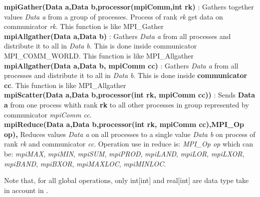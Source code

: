 \documentclass[a4paper,twoside,12pt]{book}
\begin{document}
\textbf{mpiGather(Data a,Data b,processor(mpiComm,int rk)} : Gathers together
values  \textit{Data a}  from a group of processes. Process of rank \textit{rk}
get data on communicator \textit{rk}.  This function is like MPI\_Gather\\


\textbf{mpiAllgather(Data a,Data b)} : Gathers \textit{Data a} from all
processes and distribute it to all in \textit{Data b}. This is done inside
communicator MPI\_COMM\_WORLD. This function is like MPI\_Allgather\\

\textbf{mpiAllgather(Data a,Data b, mpiComm cc)} : Gathers \textit{Data a} from
all processes and distribute it to all in \textit{Data b}. This is done inside
\textbf{communicator cc}. This function is like MPI\_Allgather\\



\textbf{mpiScatter(Data a,Data b,processor(int rk, mpiComm cc))} : Sends
\textbf{Data a} from one process whith rank \textbf{rk} to all other processes
in group represented by communicator  \textit{mpiComm cc}.\\

\textbf{mpiReduce(Data a,Data b,processor(int rk, mpiComm cc),MPI\_Op op), }
Reduces values \textit{Data a} on all processes
to a single value \textit{Data b} on process of rank \textit{rk} and
communicator \textit{cc}.
Operation use in reduce is: \textit{MPI\_Op op} which can be: \textit{mpiMAX},
\textit{mpiMIN}, \textit{mpiSUM},
 \textit{mpiPROD}, \textit{mpiLAND}, \textit{mpiLOR}, \textit{mpiLXOR},
\textit{mpiBAND},
 \textit{mpiBXOR}, \textit{mpiMAXLOC}, \textit{mpiMINLOC}.

Note that, for all global operations, only int[int] and real[int] are data type
take in account in \freefempp.
\end{document}

